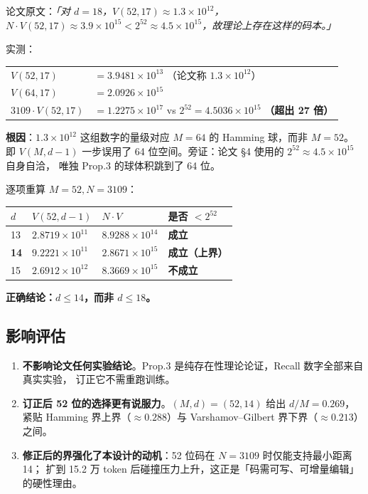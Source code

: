 \documentclass[11pt,a4paper]{ctexart}
\newcommand{\warn}[1]{\textcolor{warnred}{\textbf{#1}}}
\newcommand{\ok}[1]{\textcolor{okgreen}{\textbf{#1}}}
\theoremstyle{definition}
\begin{document}
论文原文：\emph{「对 $d=18$，$V(52,17)\approx1.3\times10^{12}$，
$N\cdot V(52,17)\approx3.9\times10^{15}<2^{52}\approx4.5\times10^{15}$，故理论上存在这样的码本。」}

实测：
\begin{center}
\begin{tabular}{@{}ll@{}}
$V(52,17)$ & $=3.9481\times10^{13}$ \quad（论文称 $1.3\times10^{12}$）\\
$V(64,17)$ & $=2.0926\times10^{15}$\\
$3109\cdot V(52,17)$ & $=1.2275\times10^{17}$ \quad vs \quad $2^{52}=4.5036\times10^{15}$ \warn{（超出 27 倍）} \\
\end{tabular}
\end{center}

\textbf{根因}：$1.3\times10^{12}$ 这组数字的量级对应 $M=64$ 的 Hamming 球，而非 $M=52$。
即 $V(M,d-1)$ 一步误用了 64 位空间。旁证：论文 §4 使用的 $2^{52}\approx4.5\times10^{15}$ 自身自洽，
唯独 Prop.3 的球体积跳到了 64 位。

逐项重算 $M=52,N=3109$：
\begin{center}
\begin{tabular}{@{}llll@{}}
\toprule
$d$ & $V(52,d-1)$ & $N\cdot V$ & 是否 $<2^{52}$ \\
\midrule
13 & $2.8719\times10^{11}$ & $8.9288\times10^{14}$ & \ok{成立} \\
\textbf{14} & $9.2221\times10^{11}$ & $2.8671\times10^{15}$ & \ok{\textbf{成立（上界）}} \\
15 & $2.6912\times10^{12}$ & $8.3669\times10^{15}$ & \warn{不成立} \\
\bottomrule
\end{tabular}
\end{center}

\textbf{正确结论：$d\le14$，而非 $d\le18$。}

\subsection{影响评估}

\begin{enumerate}
\item \textbf{不影响论文任何实验结论}。Prop.3 是纯存在性理论论证，Recall 数字全部来自真实实验，
      订正它不需重跑训练。
\item \textbf{订正后 52 位的选择更有说服力}。$(M,d)=(52,14)$ 给出 $d/M=0.269$，
      紧贴 Hamming 界上界（$\approx0.288$）与 Varshamov--Gilbert 界下界（$\approx0.213$）之间。
\item \textbf{修正后的界强化了本设计的动机}：52 位码在 $N=3109$ 时仅能支持最小距离 14；
      扩到 15.2 万 token 后碰撞压力上升，这正是「码需可写、可增量编辑」的硬性理由。
\end{enumerate}
\end{document}
